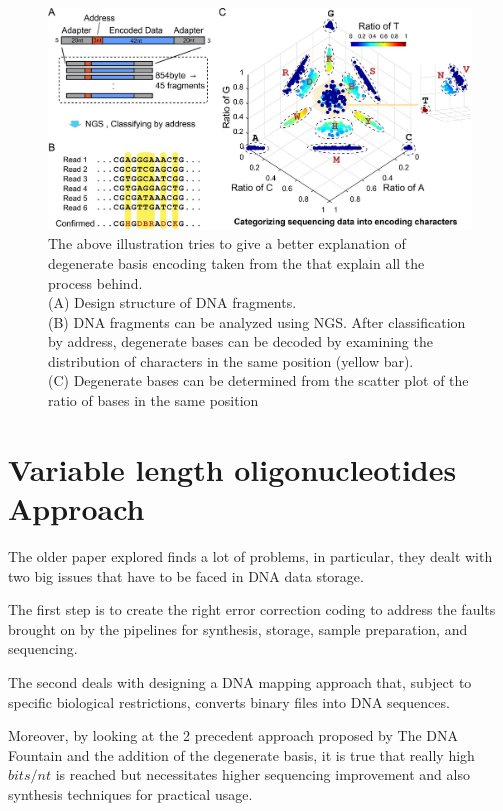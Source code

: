 \documentclass[10pt,twocolumn,twoside]{gsajnl}
\theoremstyle{definition}
\begin{document}
\begin{figure}[ht]
\centering
\includegraphics[width=\linewidth]{other on degenerate basis.jpg}
\caption{ The above illustration tries to give a better explanation of degenerate basis encoding taken from the \cite{choi2019high} that explain all the process behind.
\\(A) Design structure of DNA fragments. \\(B) DNA fragments can be analyzed using NGS. After classification by address, degenerate bases can be decoded by examining the distribution of characters in the same position (yellow bar). \\(C) Degenerate bases can be determined from the scatter plot of the ratio of bases in the same position}
\label{fig9}
\end{figure}

\section {Variable length oligonucleotides Approach}
The older paper explored finds a lot of problems, in particular, they dealt with two big issues that have to be faced in DNA data storage. 

The first step is to create the right error correction coding to address the faults brought on by the pipelines for synthesis, storage, sample preparation, and sequencing.

The second deals with designing a DNA mapping approach that, subject to specific biological restrictions, converts binary files into DNA sequences.

Moreover, by looking at the 2 precedent approach proposed by The DNA Fountain and the addition of the degenerate basis, it is true that really high $bits/nt$ is reached but necessitates higher sequencing improvement and also synthesis techniques for practical usage.
\end{document}
